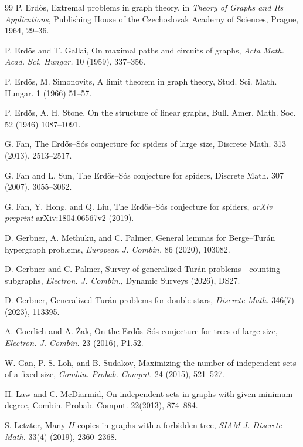 \documentclass[11pt,a4paper]{article}
\begin{document}
\begin{thebibliography}{99}
P. Erd\H{o}s,
Extremal problems in graph theory,
in \emph{Theory of Graphs and Its Applications}, Publishing House of the Czechoslovak Academy of Sciences, Prague, 1964, 29--36.

P. Erd\H{o}s and T. Gallai,
On maximal paths and circuits of graphs,
\emph{Acta Math. Acad. Sci. Hungar.} 10 (1959), 337--356.

 P. Erd\H{o}s, M. Simonovits, A limit theorem in graph theory, Stud. Sci. Math. Hungar. 1 (1966) 51--57.

 P. Erd\H{o}s, A. H. Stone, On the structure of linear graphs, Bull. Amer. Math. Soc. 52 (1946) 1087--1091.

 G. Fan, The Erd{\H{o}}s--S{\'o}s conjecture for spiders of large size, Discrete Math. 313 (2013), 2513--2517.

 G. Fan and L. Sun, The Erd{\H{o}}s--S{\'o}s conjecture for spiders, Discrete Math. 307 (2007), 3055--3062.

G. Fan, Y. Hong, and Q. Liu,
The Erd{\H{o}}s--S{\'o}s conjecture for spiders,
\emph{arXiv preprint} arXiv:1804.06567v2 (2019).

D. Gerbner, A. Methuku, and C. Palmer,
General lemmas for Berge--Tur\'{a}n hypergraph problems,
\emph{European J. Combin.} 86 (2020), 103082.

D. Gerbner and C. Palmer,
Survey of generalized Tur\'{a}n problems---counting subgraphs,
\emph{Electron. J. Combin.}, Dynamic Surveys (2026), DS27.

D. Gerbner,
Generalized Tur\'{a}n problems for double stars,
\emph{Discrete Math.} 346(7) (2023), 113395.

A. Goerlich and A. \.{Z}ak,
On the Erd\H{o}s--S\'{o}s conjecture for trees of large size,
\emph{Electron. J. Combin.} 23 (2016), P1.52.

W. Gan, P.-S. Loh, and B. Sudakov,
Maximizing the number of independent sets of a fixed size,
\emph{Combin. Probab. Comput.} 24 (2015), 521--527.

 H. Law and C. McDiarmid, On independent sets in graphs with given minimum degree, Combin. Probab. Comput. 22(2013), 874--884.

S. Letzter,
Many \(H\)-copies in graphs with a forbidden tree,
\emph{SIAM J. Discrete Math.} 33(4) (2019), 2360--2368.


\end{thebibliography}
\end{document}
